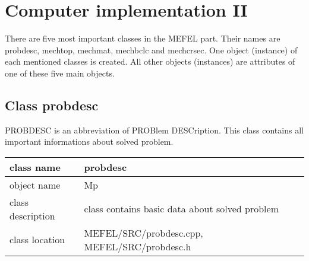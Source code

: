 \part{Computer implementation II}

There are five most important classes in the MEFEL part. Their names
are {\sf probdesc, mechtop, mechmat, mechbclc} and {\sf mechcrsec}.
One object (instance) of each mentioned classes is created. All other
objects (instances) are attributes of one of these five main objects.

\chapter{Class {\sf probdesc}}

PROBDESC is an abbreviation of PROBlem DESCription. This class contains all important
informations about solved problem.

\begin{tabular}{|l|l|}
\hline
class name & probdesc
\\ \hline
object name & Mp
\\ \hline
class description & class contains basic data about solved problem
\\ \hline
class location & MEFEL/SRC/probdesc.cpp, MEFEL/SRC/probdesc.h
\\ \hline
\end{tabular}

